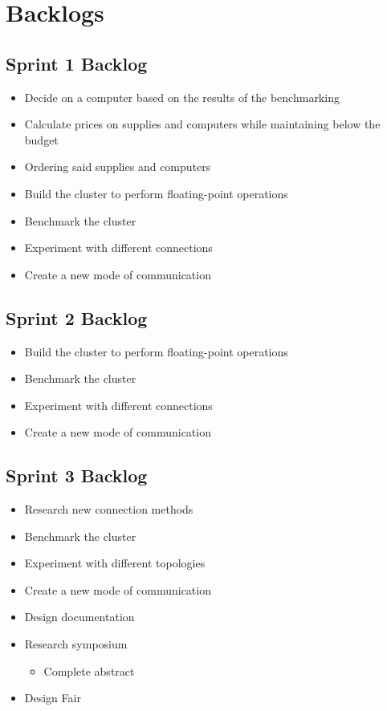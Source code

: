 

\section{Backlogs}

\subsection*{Sprint 1 Backlog}
\begin{itemize}
	\item Decide on a computer based on the results of the benchmarking
	\item Calculate prices on supplies and computers while maintaining below the budget
	\item Ordering said supplies and computers
	\item Build the cluster to perform floating-point operations
	\item Benchmark the cluster
	\item Experiment with different connections
	\item Create a new mode of communication
\end{itemize}

\subsection*{Sprint 2 Backlog}
\begin{itemize}
	\item Build the cluster to perform floating-point operations
	\item Benchmark the cluster
	\item Experiment with different connections
	\item Create a new mode of communication
\end{itemize}

\subsection*{Sprint 3 Backlog}
\begin{itemize}
	\item Research new connection methods
	\item Benchmark the cluster
	\item Experiment with different topologies
	\item Create a new mode of communication
	\item Design documentation
	\item Research symposium
	\begin{itemize}
		\item Complete abstract
	\end{itemize}
	\item Design Fair
\end{itemize}

